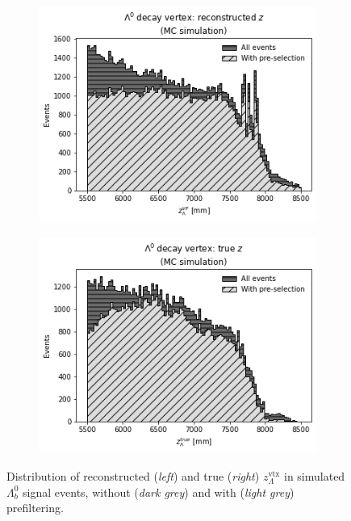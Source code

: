 \begin{figure}[t]
	\centering
	\begin{subfigure}{.45\textwidth}
		\includegraphics[width=\textwidth]{graphics/04-event_selection/Lambda_endvertex_z.png}
		\caption{}
	\end{subfigure}
	\begin{subfigure}{.45\textwidth}
		\includegraphics[width=\textwidth]{graphics/04-event_selection/Lambda_endvertex_z_true.png}
		\caption{}
	\end{subfigure}
	\caption[Distribution of reconstructed and true $z_\Lambda^\text{vtx}$ in simulated $\Lambda_b^0$ signal events.]{Distribution of reconstructed (\textit{left}) and true (\textit{right}) $z_\Lambda^\text{vtx}$ in simulated $\Lambda_b^0$ signal events, without (\textit{dark grey}) and with (\textit{light grey}) prefiltering.}
\end{figure}

